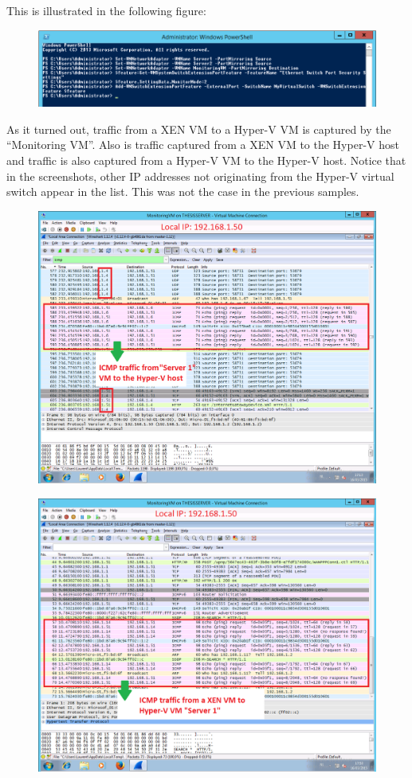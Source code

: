 \documentclass[11pt, a4paper]{article}
\begin{document}
This is illustrated in the following figure:
\begin{figure}[h]
    \centering
    \includegraphics[width=1\textwidth]{HyperV_13.png}
\end{figure}
As it turned out, traffic from a XEN VM to a Hyper-V VM is captured by the ``Monitoring VM''. Also is traffic captured from a XEN VM to the Hyper-V host and traffic is also captured from a Hyper-V VM to the Hyper-V host. Notice that in the screenshots, other IP addresses not originating from the Hyper-V virtual switch appear in the list. This was not the case in the previous samples.
\clearpage
\begin{figure}[h]
    \centering
    \includegraphics[width=1\textwidth]{HyperV_10.png}
\end{figure}
\clearpage
\begin{figure}[h]
    \centering
    \includegraphics[width=1\textwidth]{HyperV_11.png}
\end{figure}
\end{document}
